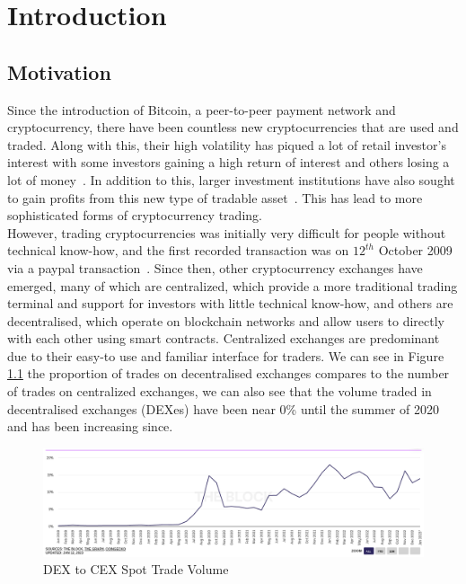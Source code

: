 \chapter{Introduction}
\section{Motivation}
Since the introduction of Bitcoin, a peer-to-peer payment network and cryptocurrency, there have been countless new cryptocurrencies that are used and traded. Along with this, their high volatility has piqued a lot of retail investor's interest with some investors gaining a high return of interest and others losing a lot of money~\cite{losing_money_on_crypto_2021}. In addition to this, larger investment institutions have also sought to gain profits from this new type of tradable asset~\cite{gondek_what_nodate}. This has lead to more sophisticated forms of cryptocurrency trading.
\\[5mm]
However, trading cryptocurrencies was initially very difficult for people without technical know-how, and the first recorded transaction was on $12^{th}$ October 2009 via a paypal transaction~\cite{noauthor_history_nodate}. Since then, other cryptocurrency exchanges have emerged, many of which are centralized, which provide a more traditional trading terminal and support for investors with little technical know-how, and others are decentralised, which operate on blockchain networks and allow users to directly with each other using smart contracts. Centralized exchanges are predominant due to their easy-to use and familiar interface for traders. We can see in Figure \ref{fig:dex_to_cex} the proportion of trades on decentralised exchanges compares to the number of trades on centralized exchanges, we can also see that the volume traded in decentralised exchanges (DEXes) have been near 0\% until the summer of 2020 and has been increasing since. 

\begin{figure}[htb!]
    \centering
    \includegraphics[width=\textwidth]{introduction/Images/dex_to_cex.png}
    \caption{{DEX} to {CEX} {Spot} {Trade} {Volume}~\cite{dex_to_cex}}
    \label{fig:dex_to_cex}
\end{figure}

